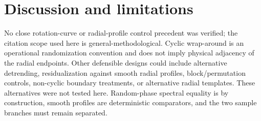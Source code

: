 
\section{Discussion and limitations}
\label{sec:discussion}

No close rotation-curve or radial-profile control precedent was verified;
the citation scope used here is general-methodological. Cyclic wrap-around is
an operational randomization convention and does not imply physical adjacency
of the radial endpoints. Other defensible designs could include alternative
detrending, residualization against smooth radial profiles, block/permutation
controls, non-cyclic boundary treatments, or alternative radial templates.
These alternatives were not tested here. Random-phase spectral equality is by
construction, smooth profiles are deterministic comparators, and the two
sample branches must remain separated.
